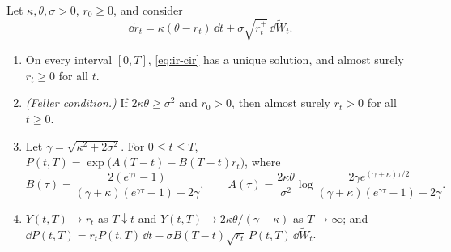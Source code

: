 \begin{proposition}\label{prop:ir-cir}
Let $\kappa,\theta,\sigma>0$, $r_0\ge0$, and consider
\begin{equation}\label{eq:ir-cir}
  \dd r_t=\kappa(\theta-r_t)\,\dd t+\sigma\sqrt{r_t^+}\,\dd\widetilde W_t .
\end{equation}
\begin{enumerate}[label=(\roman*)]
  \item On every interval $[0,T]$, \eqref{eq:ir-cir} has a unique solution, and almost surely
    $r_t\ge0$ for all $t$.
  \item \emph{(Feller condition.)} If $2\kappa\theta\ge\sigma^2$ and $r_0>0$, then almost surely
    $r_t>0$ for all $t\ge0$.
  \item Let $\gamma=\sqrt{\kappa^2+2\sigma^2}$. For $0\le t\le T$,
    $P(t,T)=\exp\big(A(T-t)-B(T-t)r_t\big)$, where
    \[
      B(\tau)=\frac{2(e^{\gamma\tau}-1)}{(\gamma+\kappa)(e^{\gamma\tau}-1)+2\gamma},\qquad
      A(\tau)=\frac{2\kappa\theta}{\sigma^2}\log\frac{2\gamma e^{(\gamma+\kappa)\tau/2}}{(\gamma+\kappa)(e^{\gamma\tau}-1)+2\gamma}.
    \]
  \item $Y(t,T)\to r_t$ as $T\downarrow t$ and $Y(t,T)\to2\kappa\theta/(\gamma+\kappa)$ as
    $T\to\infty$; and $\dd P(t,T)=r_tP(t,T)\,\dd t-\sigma B(T-t)\sqrt{r_t}\,P(t,T)\,\dd\widetilde W_t$.
\end{enumerate}
\end{proposition}

